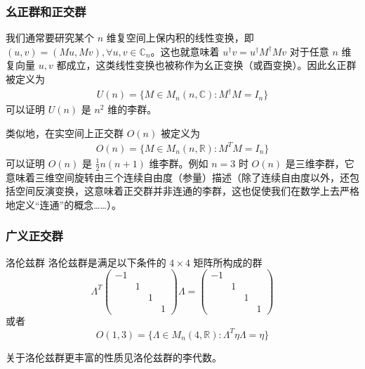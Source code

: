 \subsubsection{幺正群和正交群}
我们通常要研究某个 $n$ 维复空间上保内积的线性变换，即 $(u,v)=(Mu,Mv),\forall u,v\in \mathbb{C}_n$。这也就意味着 $u^\dagger v=u^\dagger M^\dagger M v$ 对于任意 $n$ 维复向量 $u,v$ 都成立，这类线性变换也被称作为幺正变换（或酉变换）。因此幺正群被定义为
\begin{equation}
\begin{aligned}
U(n)=\{ M\in M_n(n,\mathbb C): M^\dagger M=I_n \}
\end{aligned}
\end{equation}
可以证明 $U(n)$ 是 $n^2$ 维的李群。

类似地，在实空间上正交群 $O(n)$ 被定义为 
\begin{equation}
\begin{aligned}
O(n)=\{ M\in M_n(n,\mathbb R): M^T M=I_n \}
\end{aligned}
\end{equation}
可以证明 $O(n)$ 是 $\frac{1}{2}n(n+1)$ 维李群。例如 $n=3$ 时 $O(n)$ 是三维李群，它意味着三维空间旋转由三个连续自由度（参量）描述（除了连续自由度以外，还包括空间反演变换，这意味着正交群并非连通的李群，这也促使我们在数学上去严格地定义“连通”的概念……）。
\subsubsection{广义正交群}
\begin{definition}{洛伦兹群}
洛伦兹群是满足以下条件的 $4\times 4$ 矩阵所构成的群
\begin{equation}
\Lambda^T \begin{pmatrix}
-1&&&\\
&1&&\\
&&1&\\
&&&1
\end{pmatrix}\Lambda =\begin{pmatrix}
-1&&&\\
&1&&\\
&&1&\\
&&&1
\end{pmatrix}
\end{equation}
或者
\begin{equation}
O(1,3)=\{\Lambda\in M_n(4,\mathbb R):\Lambda^T\eta\Lambda=\eta\}
\end{equation}

\end{definition}
关于洛伦兹群更丰富的性质见洛伦兹群的李代数。

